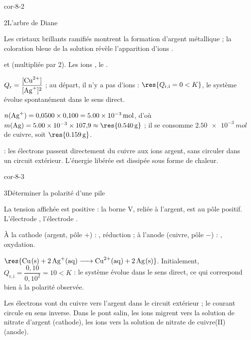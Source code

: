 \begin{blocLivre}{cor-8-2}
\begin{corrige}{2}{L'arbre de Diane}
\begin{questions}
\item Les cristaux brillants ramifiés montrent la formation d'argent métallique ; la coloration bleue de la solution
révèle l'apparition d'ions .
\item {} et  (multipliée par 2). Les ions ,
le .
\item $Q_\mathrm{r}=\dfrac{[\ce{Cu^2+}]}{[\ce{Ag+}]^2}$ ; au départ, il n'y a pas d'ions  :
$\res{Q_{\mathrm{r},\mathrm{i}}=0<K}$, le système évolue spontanément dans le sens direct.
\item $n(\ce{Ag+})=0{,}0500\times0{,}100=\qty{5,00e-3}{mol}$, d'où $m(\ce{Ag})=\num{5.00e-3}\times107{,}9\approx\res{\qty{0,540}{g}}$ ;
il se consomme $\qty{2,50e-3}{mol}$ de cuivre, soit $\res{\qty{0,159}{g}}$.
\item {} : les électrons passent directement du cuivre aux ions argent, sans circuler dans un circuit
extérieur. L'énergie libérée est dissipée sous forme de chaleur.
\end{questions}
\end{corrige}
\end{blocLivre}
\begin{blocLivre}{cor-8-3}
\begin{corrige}{3}{Déterminer la polarité d'une pile}
\begin{questions}
\item La tension affichée est positive : la borne V, reliée à l'argent, est au pôle positif. L'électrode
, l'électrode .
\item À la cathode (argent, pôle $+$) : , réduction ; à l'anode (cuivre, pôle $-$) :
, oxydation.
\item $\res{\ce{Cu(s) + 2 Ag^+(aq) -> Cu^2+(aq) + 2 Ag(s)}}$. Initialement,
$Q_{\mathrm{r},\mathrm{i}}=\dfrac{0{,}10}{0{,}10^2}=10<K$ : le système évolue dans le sens direct, ce qui correspond bien à la
polarité observée.
\item Les électrons vont du cuivre vers l'argent dans le circuit extérieur ; le courant circule en sens inverse. Dans le
pont salin, les ions  migrent vers la solution de nitrate d'argent (cathode), les ions  vers la
solution de nitrate de cuivre(II) (anode).
\end{questions}
\end{corrige}
\end{blocLivre}
